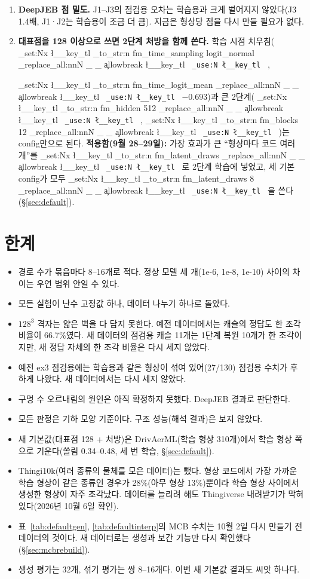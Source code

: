 \documentclass[11pt]{article}
\DeclareRobustCommand{\key}[1]{
  \tl_set:Nx \l__key_tl { \tl_to_str:n {#1} }
  \regex_replace_all:nnN { \_ } { \cO\_ \c{allowbreak} } \l__key_tl
  \texttt{ \tl_use:N \l__key_tl }
}
\begin{document}
\begin{enumerate}
방향이 같고 다름에 따른 차이(2.5 대 5.3)가 훨씬 크므로(표~\ref{tab:orient}) 지금 튐의 주원인은 종류가 아니라 방향이다. 방향을 정렬한 뒤에도 잠금 조건에서 육각이 나오는 일이 남으면 그때 \key{condition_names}에 종류를 넣는다.
\textbf{적용함(10월 2일):} 방향 정렬과 함께 종류 5개의 0/1 표시와 구멍 수(\key{hole_count})를 조건에 넣었다(\S\ref{sec:mcbrebuild}).
\item \textbf{DeepJEB 점 밀도.} J1--J3의 점검용 오차는 학습용과 크게 벌어지지 않았다(J3 1.4배, J1·J2는 학습용이 조금 더 큼).
지금은 형상당 점을 다시 만들 필요가 없다.
\item \textbf{대표점을 128 이상으로 쓰면 2단계 처방을 함께 쓴다.} 학습 시점 치우침(\key{fm_time_sampling logit_normal},
\key{fm_time_logit_mean} $-0.693$)과 큰 2단계(\key{fm_hidden 512}, \key{fm_blocks 12})는 config만으로 된다.
\textbf{적용함(9월 28--29일):} 가장 효과가 큰 ``형상마다 코드 여러 개''를 \key{fm_latent_draws}로 2단계 학습에 넣었고, 세 기본 config가 모두 \key{fm_latent_draws 8}을 쓴다(\S\ref{sec:default}).
\end{enumerate}

\section{한계}
\label{sec:limits}

\begin{itemize}
\item 경로 수가 묶음마다 8--16개로 적다. 정상 모델 세 개(1e-6, 1e-8, 1e-10) 사이의 차이는 우연 범위 안일 수 있다.
\item 모든 실험이 난수 고정값 하나, 데이터 나누기 하나로 돌았다.
\item $128^3$ 격자는 얇은 벽을 다 담지 못한다. 예전 데이터에서는 캐슬의 정답도 한 조각 비율이 66.7\%였다. 새 데이터의 점검용 캐슬 11개는 1단계 복원 10개가 한 조각이지만, 새 정답 자체의 한 조각 비율은 다시 세지 않았다.
\item 예전 ex3 점검용에는 학습용과 같은 형상이 섞여 있어(27/130) 점검용 수치가 후하게 나왔다. 새 데이터에서는 다시 세지 않았다.
\item 구멍 수 오르내림의 원인은 아직 확정하지 못했다. DeepJEB 결과로 판단한다.
\item 모든 판정은 기하 모양 기준이다. 구조 성능(해석 결과)은 보지 않았다.
\item 새 기본값(대표점 128 + 처방)은 DrivAerML(학습 형상 310개)에서 학습 형상 쪽으로 기운다(쏠림 0.34--0.48, 세 번 학습, \S\ref{sec:default}).
\item Thingi10k(여러 종류의 물체를 모은 데이터)는 뺐다. 형상 코드에서 가장 가까운 학습 형상이 같은 종류인 경우가 28\%(아무 형상 13\%)뿐이라 학습 형상 사이에서 생성한 형상이 자주 조각났다.
데이터를 늘리려 해도 Thingiverse 내려받기가 막혀 있다(2026년 10월 6일 확인).
\item 표~\ref{tab:defaultgen}, \ref{tab:defaultinterp}의 MCB 수치는 10월 2일 다시 만들기 전 데이터의 것이다. 새 데이터로는 생성과 보간 기능만 다시 확인했다(\S\ref{sec:mcbrebuild}).
\item 생성 평가는 32개, 섞기 평가는 쌍 8--16개다. 이번 새 기본값 결과도 씨앗 하나다.
\end{itemize}
\end{document}
